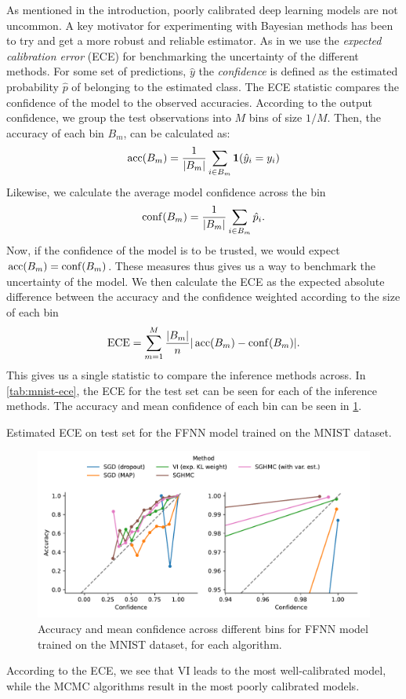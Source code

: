 As mentioned in the introduction, poorly calibrated deep learning models are not uncommon. 
A key motivator for experimenting with Bayesian methods has been to try and get a more robust and reliable estimator.
As in \cite{guo_calibration_2017} we use the \emph{expected calibration error} (ECE) for benchmarking the uncertainty of the different methods.
For some set of predictions, $\hat{y}$ the \emph{confidence} is defined as the estimated probability $\hat{p}$ of belonging to the estimated class.
The ECE statistic compares the confidence of the model to the observed accuracies.
According to the output confidence, we group the test observations into $M$ bins of size $1/M$. 
Then, the accuracy of each bin $B_m$, can be calculated as:
\begin{align}
    \operatorname{acc}(B_m) = \frac{1}{|B_m|}\sum_{i\in B_m}\bm{1}(\hat{y}_i = y_i)
\end{align}
Likewise, we calculate the average model confidence across the bin
\begin{align}
    \operatorname{conf}(B_m) = \frac{1}{|B_m|}\sum_{i\in B_m} \hat{p}_i.
\end{align}
Now, if the confidence of the model is to be trusted, we would expect $\operatorname{acc}(B_m) = \operatorname{conf}(B_m)$.
These measures thus gives us a way to benchmark the uncertainty of the model.
We then calculate the ECE as the expected absolute difference between the accuracy and the confidence weighted according to the size of each bin
\begin{align}
    \text{ECE} = \sum_{m=1}^{M} \frac{|B_m|}{n}|\operatorname{acc}(B_m)-\operatorname{conf}(B_m)|.
\end{align}
This gives us a single statistic to compare the inference methods across.
In \cref{tab:mnist-ece}, the ECE for the test set can be seen for each of the inference methods.
The accuracy and mean confidence of each bin can be seen in \cref{fig:mnist-calibration}. 
\begin{table}[htbp]
    \centering
    
    \caption{Estimated ECE on test set for the FFNN model trained on the MNIST dataset.}
    \label{tab:mnist-ece}
\end{table}
\begin{figure}[htbp]
    \centering
    \includegraphics[width=\linewidth]{Figures/mnist-calibration.pdf}
    \caption{Accuracy and mean confidence across different bins for FFNN model trained on the MNIST dataset, for each algorithm.}
    \label{fig:mnist-calibration}
\end{figure}
According to the ECE, we see that VI leads to the most well-calibrated model, while the MCMC algorithms result in the most poorly calibrated models.

